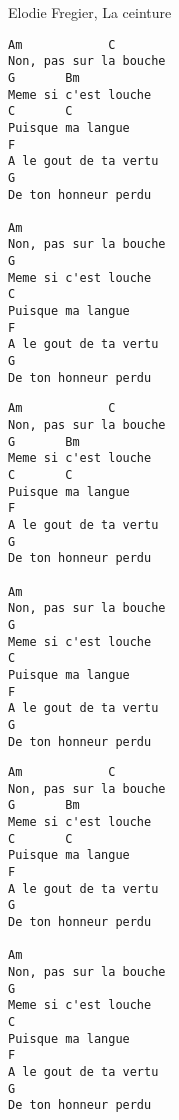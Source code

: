 \documentclass[12pt]{article}
\begin{document}
Elodie Fregier, La ceinture

\begin{multicols}{3}

\begin{verbatim}
Am            C
Non, pas sur la bouche
G       Bm
Meme si c'est louche
C       C
Puisque ma langue
F
A le gout de ta vertu
G
De ton honneur perdu

Am
Non, pas sur la bouche
G
Meme si c'est louche
C
Puisque ma langue
F
A le gout de ta vertu
G
De ton honneur perdu
\end{verbatim}


\columnbreak
\begin{verbatim}
Am            C
Non, pas sur la bouche
G       Bm
Meme si c'est louche
C       C
Puisque ma langue
F
A le gout de ta vertu
G
De ton honneur perdu

Am
Non, pas sur la bouche
G
Meme si c'est louche
C
Puisque ma langue
F
A le gout de ta vertu
G
De ton honneur perdu
\end{verbatim}

\columnbreak
\begin{verbatim}
Am            C
Non, pas sur la bouche
G       Bm
Meme si c'est louche
C       C
Puisque ma langue
F
A le gout de ta vertu
G
De ton honneur perdu

Am
Non, pas sur la bouche
G
Meme si c'est louche
C
Puisque ma langue
F
A le gout de ta vertu
G
De ton honneur perdu
\end{verbatim}

\end{multicols}
\end{document}
